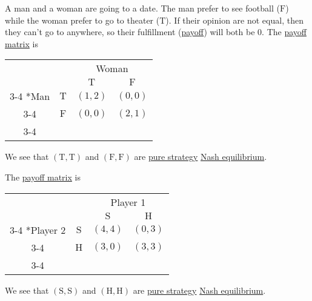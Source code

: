 \begin{eg}\label{eg:battle-of-the-sexes}
	A man and a woman are going to a date. The man prefer to see football (\(\mathrm{F}\)) while the woman prefer to go to theater (\(\mathrm{T}\)). If their opinion are not equal, then they can't go to anywhere, so their fulfillment (\hyperref[def:reward]{payoff}) will both be \(0\). The \hyperref[def:payoff-matrix]{payoff matrix} is
	\begin{table}[H]
		\centering
		\setlength{\extrarowheight}{2pt}
		\begin{tabular}{cc|c|c|}
			                   & \multicolumn{1}{c}{} & \multicolumn{2}{c}{Woman}                                           \\
			                   & \multicolumn{1}{c}{} & \multicolumn{1}{c}{$\mathrm{T}$} & \multicolumn{1}{c}{$\mathrm{F}$} \\\cline{3-4}
			\multirow{2}*{Man} & $\mathrm{T}$         & $(1, 2)$                         & $(0, 0)$                         \\\cline{3-4}
			                   & $\mathrm{F}$         & $(0, 0)$                         & $(2, 1)$                         \\\cline{3-4}
		\end{tabular}
	\end{table}
	We see that \((\mathrm{T}, \mathrm{T})\) and \((\mathrm{F}, \mathrm{F})\) are \hyperref[def:pure-strategy]{pure strategy} \hyperref[def:Nash-equilibrium]{Nash equilibrium}.
\end{eg}

\begin{eg}\label{eg:stay-hunt}
	The \hyperref[def:payoff-matrix]{payoff matrix} is
	\begin{table}[H]
		\centering
		\setlength{\extrarowheight}{2pt}
		\begin{tabular}{cc|c|c|}
			                        & \multicolumn{1}{c}{} & \multicolumn{2}{c}{Player 1}                                        \\
			                        & \multicolumn{1}{c}{} & \multicolumn{1}{c}{$\mathrm{S}$} & \multicolumn{1}{c}{$\mathrm{H}$} \\\cline{3-4}
			\multirow{2}*{Player 2} & $\mathrm{S}$         & $(4, 4)$                         & $(0, 3)$                         \\\cline{3-4}
			                        & $\mathrm{H}$         & $(3, 0)$                         & $(3, 3)$                         \\\cline{3-4}
		\end{tabular}
	\end{table}
	We see that \((\mathrm{S}, \mathrm{S})\) and \((\mathrm{H}, \mathrm{H})\) are \hyperref[def:pure-strategy]{pure strategy} \hyperref[def:Nash-equilibrium]{Nash equilibrium}.
\end{eg}

